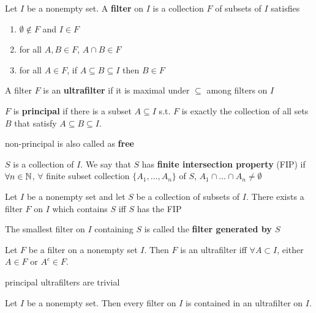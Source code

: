 \documentclass[11pt]{article}
\begin{document}
\begin{definition}[]
Let \(I\) be a nonempty set. A \textbf{filter} on \(I\) is a collection \(F\) of subsets of \(I\) satisfies
\begin{enumerate}
\item \(\emptyset\not\in F\) and \(I\in F\)
\item for all \(A,B\in F\), \(A\cap B\in F\)
\item for all \(A\in F\), if \(A\subseteq B\subseteq I\) then \(B\in F\)
\end{enumerate}


A filter \(F\) is an \textbf{ultrafilter} if it is maximal under \(\subseteq\) among filters on \(I\)

\(F\) is \textbf{principal} if there is a subset \(A\subseteq I\) s.t. \(F\) is exactly the collection of
all sets \(B\) that satisfy \(A\subseteq B\subseteq I\).

non-principal is also called as \textbf{free}
\end{definition}

\begin{definition}[]
\(S\) is a collection of \(I\). We say that \(S\) has \textbf{finite intersection property} (FIP)
if \(\forall n\in\mathbb{N}\), \(\forall\) finite subset collection \(\{A_1,\dots,A_n\}\)
of \(S\), \(A_1\cap\dots\cap A_n\neq\emptyset\)
\end{definition}

\begin{lemma}[]
\label{lemmaB.2}
Let \(I\) be a nonempty set and let \(S\) be a collection of subsets of \(I\). There exists a
filter \(F\) on \(I\) which contains \(S\) iff \(S\) has the FIP
\end{lemma}

\begin{remark}
The smallest filter on \(I\) containing \(S\) is called the \textbf{filter generated by \(S\)}
\end{remark}

\begin{lemma}[]
\label{lemmaB.3}
Let \(F\) be a filter on a nonempty set \(I\). Then \(F\) is an ultrafilter iff \(\forall A\subset I\),
either \(A\in F\) or \(A^c\in F\).
\end{lemma}

\begin{remark}
principal ultrafilters are trivial
\end{remark}

\begin{theorem}[]
\label{thmB.4}
Let \(I\) be a nonempty set. Then every filter on \(I\) is contained in an ultrafilter on \(I\).
\end{theorem}
\end{document}
